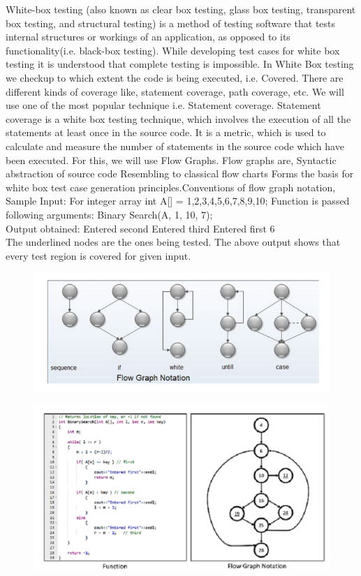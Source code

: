 \documentclass{article}
\begin{document}
	White-box testing (also known as clear box testing, glass box testing, transparent box testing, and structural testing) is a method of testing software that tests internal structures or workings of an application, as opposed to its functionality(i.e. black-box testing). While developing 
	test cases for white box testing it is understood that complete testing 
	is impossible. In White Box testing we checkup to which extent the code 
	is being executed, i.e. Covered. There are different kinds of coverage like, statement coverage, path coverage, etc. We will use one of the most popular technique i.e. Statement coverage. Statement coverage is a white box testing technique, which involves the execution of all the statements at least once in the source code. It is a metric, which is used to calculate and measure the number of statements in the source code which have been executed. For this, we will use Flow Graphs. Flow graphs are, Syntactic abstraction of source code Resembling to classical flow charts Forms the basis for white box test case generation principles.Conventions of flow graph notation, \\
	Sample Input: For integer array int A[] = 1,2,3,4,5,6,7,8,9,10; Function 
	is passed\\
	following arguments: Binary Search(A, 1, 10, 7);\\
	Output obtained: Entered second Entered third Entered first 6\\
	The underlined nodes are the ones being tested. The above output shows
	that every test region is covered for given input.\\
	\begin{figure}[h!]
		\centering
		\includegraphics[scale=0.5]{pqr.png}
	\end{figure}
	
	\begin{figure}[h!]
		\centering
		\includegraphics[scale=0.5]{xyz.png}
	\end{figure}
	
\end{document}
